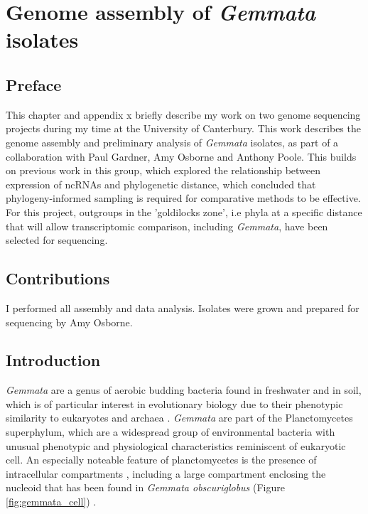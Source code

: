 \chapter{Genome assembly of \textit{Gemmata} isolates}
\label{chap:assembly}

\section{Preface}
This chapter and appendix x briefly describe my work on two genome sequencing projects during my time at the University of Canterbury. This work describes the genome assembly and preliminary analysis of \textit{Gemmata} isolates, as part of a collaboration with Paul Gardner, Amy Osborne and Anthony Poole. This builds on previous work in this group, which explored the relationship between expression of ncRNAs and phylogenetic distance, which concluded that phylogeny-informed sampling is required for comparative methods to be effective. For this project, outgroups in the 'goldilocks zone', i.e phyla at a specific distance that will allow transcriptomic comparison, including \textit{Gemmata}, have been selected for sequencing. 

\section{Contributions}
I performed all assembly and data analysis. Isolates were grown and prepared for sequencing by Amy Osborne.
\newpage
\section{Introduction}

\textit{Gemmata} are a genus of aerobic budding bacteria found in freshwater and in soil, which is of particular interest in evolutionary biology due to their phenotypic similarity to eukaryotes and archaea \citep{Franzmann1984-ms,Devos2013-ds}. \textit{Gemmata} are part of the Planctomycetes superphylum, which are a widespread group of environmental bacteria with unusual phenotypic and physiological characteristics reminiscent of eukaryotic cell. An especially noteable feature of planctomycetes is the presence of intracellular compartments \citep{Lindsay2001-qg}, including a large compartment enclosing the nucleoid that has been found in \textit{Gemmata obscuriglobus} (Figure \ref{fig:gemmata_cell}) \citep{Fuerst2005-kx}. 

